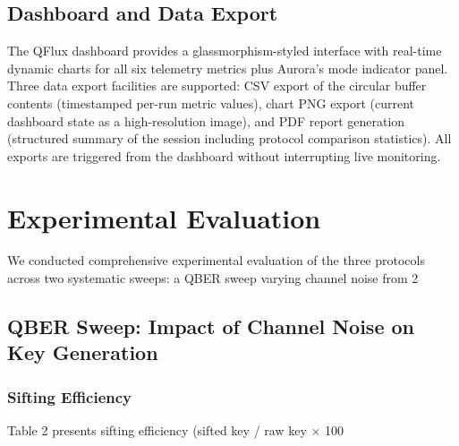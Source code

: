 \subsection{Dashboard and Data Export}
The QFlux dashboard provides a glassmorphism-styled interface with real-time dynamic charts for all six telemetry metrics plus Aurora's mode indicator panel. Three data export facilities are supported: CSV export of the circular buffer contents (timestamped per-run metric values), chart PNG export (current dashboard state as a high-resolution image), and PDF report generation (structured summary of the session including protocol comparison statistics). All exports are triggered from the dashboard without interrupting live monitoring.

\section{Experimental Evaluation}
We conducted comprehensive experimental evaluation of the three protocols across two systematic sweeps: a QBER sweep varying channel noise from 2%

\subsection{QBER Sweep: Impact of Channel Noise on Key Generation}
\subsubsection{Sifting Efficiency}
Table 2 presents sifting efficiency (sifted key / raw key × 100%

